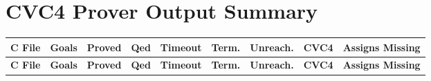 \documentclass{article}
\begin{document}
\clearpage

\section*{CVC4 Prover Output Summary}

\scriptsize
\begin{longtable}{p{3.5cm} >{\centering\arraybackslash}p{0.8cm} >{\centering\arraybackslash}p{1.3cm} >{\centering\arraybackslash}p{0.7cm} >{\centering\arraybackslash}p{0.9cm} >{\centering\arraybackslash}p{0.9cm} >{\centering\arraybackslash}p{0.9cm} >{\centering\arraybackslash}p{1cm} >{\centering\arraybackslash}p{1.8cm}}
\toprule
\textbf{C File} & \textbf{Goals} & \textbf{Proved} & \textbf{Qed} & \textbf{Timeout} & \textbf{Term.} & \textbf{Unreach.} & \textbf{CVC4} & \textbf{Assigns Missing} \\
\midrule
\endfirsthead

\toprule
\textbf{C File} & \textbf{Goals} & \textbf{Proved} & \textbf{Qed} & \textbf{Timeout} & \textbf{Term.} & \textbf{Unreach.} & \textbf{CVC4} & \textbf{Assigns Missing} \\
\midrule
\endhead


\end{longtable}
\end{document}
